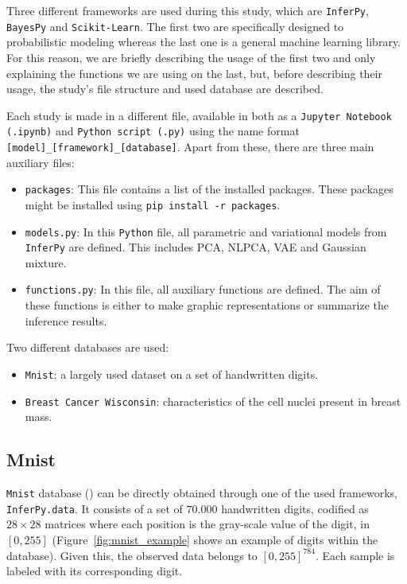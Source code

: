 
Three different frameworks are used during this study, which are \texttt{InferPy}, \texttt{BayesPy} and \texttt{Scikit-Learn}. The first two are specifically designed to probabilistic modeling whereas the last one is a general machine learning library. For this reason, we are briefly describing the usage of the first two and only explaining the functions we are using on the last, but, before describing their usage, the study's file structure and used database are described.

Each study is made in a different file, available in both as a \texttt{Jupyter Notebook (.ipynb)} and \texttt{Python script (.py)} using the name format \texttt{[model]\_[framework]\_[database]}. Apart from these, there are three main auxiliary files:

\begin{itemize}
  \item \texttt{packages}: This file contains a list of the installed packages. These packages might be installed using \texttt{pip install -r packages}.
  \item \texttt{models.py}: In this \texttt{Python} file, all parametric and variational models from \texttt{InferPy} are defined. This includes PCA, NLPCA, VAE and Gaussian mixture.
  \item \texttt{functions.py}: In this file, all auxiliary functions are defined. The aim of these functions is either to make graphic representations or summarize the inference results.
\end{itemize}

Two different databases are used:
\begin{itemize}
  \item \texttt{Mnist}: a largely used dataset on a set of handwritten digits.
  \item \texttt{Breast Cancer Wisconsin}: characteristics of the cell nuclei present in breast mass.
\end{itemize}

\subsection{Mnist}

\texttt{Mnist} database (\cite{lecun-mnisthandwrittendigit-2010}) can be directly obtained through one of the used frameworks, \texttt{InferPy.data}. It consists of a set of \(70.000\)  handwritten digits, codified as \(28\times 28\) matrices where each position is the gray-scale value of the digit, in \([0,255]\)  (Figure~\ref{fig:mnist_example} shows an example of digits within the database). Given this, the observed data belongs to \([0, 255]^{784}\). Each sample is labeled with its corresponding digit.

